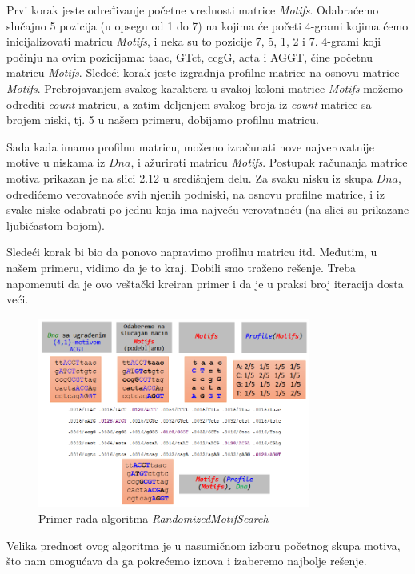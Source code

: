 Prvi korak jeste određivanje početne vrednosti matrice \textit{Motifs}. Odabraćemo slučajno 5 pozicija (u opsegu od 1 do 7) na kojima će početi 4-grami kojima ćemo inicijalizovati matricu \textit{Motifs}, i neka su to pozicije 7, 5, 1, 2 i 7. 4-grami koji počinju na ovim pozicijama: taac, GTct, ccgG, acta i AGGT, čine početnu matricu \textit{Motifs}. Sledeći korak jeste izgradnja profilne matrice na osnovu matrice \textit{Motifs}. Prebrojavanjem svakog karaktera u svakoj koloni matrice \textit{Motifs} možemo odrediti \textit{count} matricu, a zatim deljenjem svakog broja iz \textit{count} matrice sa brojem niski, tj. 5 u našem primeru, dobijamo profilnu matricu. 

Sada kada imamo profilnu matricu, možemo izračunati nove najverovatnije motive u niskama iz $Dna$, i ažurirati matricu \textit{Motifs}. Postupak računanja matrice motiva prikazan je na slici 2.12 u središnjem delu. Za svaku nisku iz skupa $Dna$, odredićemo verovatnoće svih njenih podniski, na osnovu profilne matrice, i iz svake niske odabrati po jednu koja ima najveću verovatnoću (na slici su prikazane ljubičastom bojom). 

Sledeći korak bi bio da ponovo napravimo profilnu matricu itd. Međutim, u našem primeru, vidimo da je to kraj. Dobili smo traženo rešenje. Treba napomenuti da je ovo veštački kreiran primer i da je u praksi broj iteracija dosta veći.

\begin{figure}[h]
\centering
\includegraphics[width=0.8\textwidth]{poglavlja/2/slike/69.PNG}
\caption{Primer rada algoritma \textit{RandomizedMotifSearch}}
\label{slika: randomized}
\end{figure}


Velika prednost ovog algoritma je u nasumičnom izboru početnog skupa motiva, što nam omogućava da ga pokrećemo iznova i izaberemo najbolje rešenje.

